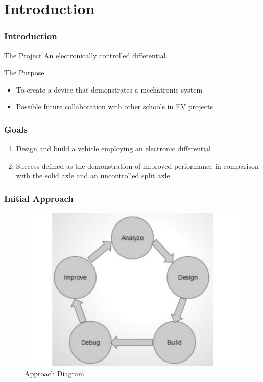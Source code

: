 \documentclass{beamer}
\begin{document}
\section{Introduction}
\begin{frame}
  \frametitle{Introduction}
	
	\begin{block}{The Project}
    	An electronically controlled differential.
  	\end{block}
	
	\begin{block}{The Purpose}
		\begin{itemize}
			\item To create a device that demonstrates a mechatronic system
			\item Possible future collaboration with other schools in EV projects 
		\end{itemize}	
	\end{block}
\end{frame}
\begin{frame}
  \frametitle{Goals}
  \begin{enumerate}
    \item Design and build a vehicle employing an electronic differential
  	\item Success defined as the demonstration of improved performance in comparison 	with the solid axle and an uncontrolled split axle
  \end{enumerate}
\end{frame}
\begin{frame}
	\frametitle{Initial Approach}
	\begin{figure}
		\centering 
		\includegraphics[scale=.3]{figures/approach.pdf}
		\caption{Approach Diagram} 
	\end{figure}	
\end{frame}
\end{document}
